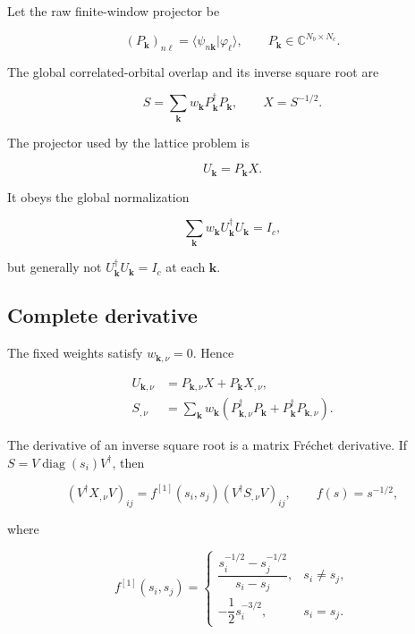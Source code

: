 \documentclass[11pt]{article}
\numberwithin{equation}{section}
\newcommand{\diag}{\operatorname{diag}}
\newcommand{\kb}{\mathbf k}
\begin{document}
Let the raw finite-window projector be

\begin{equation}
 (P_{\kb})_{n\ell}=\langle\psi_{n\kb}|\varphi_\ell\rangle,
 \qquad P_{\kb}\in\mathbb C^{N_b\times N_c}.
 \label{eq:rawP}
\end{equation}

The global correlated-orbital overlap and its inverse square root are

\begin{equation}
 S=\sum_{\kb}w_{\kb}P_{\kb}^\dagger P_{\kb},
 \qquad X=S^{-1/2}.
 \label{eq:SX}
\end{equation}

The projector used by the lattice problem is

\begin{equation}
 \boxed{U_{\kb}=P_{\kb}X.}
 \label{eq:normalizedU}
\end{equation}

It obeys the global normalization

\begin{equation}
 \sum_{\kb}w_{\kb}U_{\kb}^\dagger U_{\kb}=I_c,
 \label{eq:globalnorm}
\end{equation}

but generally not $U_{\kb}^\dagger U_{\kb}=I_c$ at each $\kb$.

\subsection{Complete derivative}

The fixed weights satisfy $w_{\kb,\nu}=0$.  Hence

\begin{align}
 U_{\kb,\nu}&=P_{\kb,\nu}X+P_{\kb}X_{,\nu},
 \label{eq:Uderiv}\\
 S_{,\nu}&=\sum_{\kb}w_{\kb}
 \left(P_{\kb,\nu}^\dagger P_{\kb}
 +P_{\kb}^\dagger P_{\kb,\nu}\right).
 \label{eq:Sderiv}
\end{align}

The derivative of an inverse square root is a matrix Fr\'echet derivative.
If $S=V\diag(s_i)V^\dagger$, then

\begin{equation}
 (V^\dagger X_{,\nu}V)_{ij}
 =f^{[1]}(s_i,s_j)(V^\dagger S_{,\nu}V)_{ij},
 \qquad f(s)=s^{-1/2},
 \label{eq:Frechet}
\end{equation}

where

\begin{equation}
 f^{[1]}(s_i,s_j)=
 \begin{cases}
 \dfrac{s_i^{-1/2}-s_j^{-1/2}}{s_i-s_j},&s_i\ne s_j,\\[6pt]
 -\dfrac12s_i^{-3/2},&s_i=s_j.
 \end{cases}
\end{equation}
\end{document}
